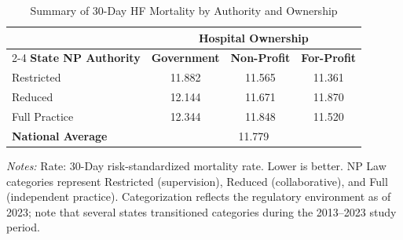 \begin{table}[htbp]
    \centering
    \caption{Summary of 30-Day HF Mortality by Authority and Ownership}
    \label{tab:mortality_rate_hf}
    \vspace{0.2cm}
    \begin{tabular}{lccc}
        \toprule
        & \multicolumn{3}{c}{\textbf{Hospital Ownership}} \\
        \cmidrule(lr){2-4}
        \textbf{State NP Authority} & \textbf{Government} & \textbf{Non-Profit} & \textbf{For-Profit} \\
        \midrule
        Restricted & 11.882 & 11.565 & 11.361 \\
        Reduced & 12.144 & 11.671 & 11.870 \\
        Full Practice & 12.344 & 11.848 & 11.520 \\
        \midrule
        \textbf{National Average} & \multicolumn{3}{c}{11.779} \\
        \bottomrule
    \end{tabular}
    \vspace{0.1cm}
    \begin{minipage}{0.85\textwidth}
        \footnotesize \textit{Notes:} Rate: 30-Day risk-standardized mortality rate. Lower is better. NP Law categories represent Restricted (supervision), Reduced (collaborative), and Full (independent practice). Categorization reflects the regulatory environment as of 2023; note that several states transitioned categories during the 2013--2023 study period.
    \end{minipage}
\end{table}
